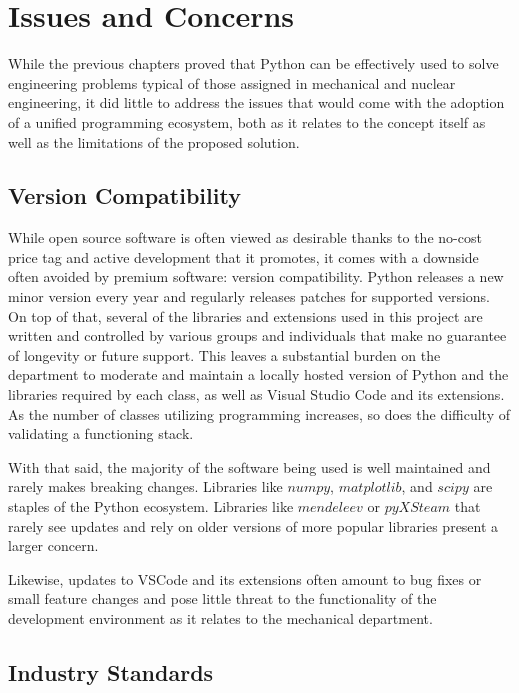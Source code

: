 \section{Issues and Concerns}

While the previous chapters proved that Python can be effectively
used to solve engineering problems typical of those assigned in 
mechanical and nuclear engineering, it did 
little to address the issues that would come with the adoption 
of a unified programming ecosystem, both as it relates to the
concept itself as well as the limitations of the proposed solution.

\subsection{Version Compatibility}

While open source software is often viewed as desirable
thanks to the no-cost price tag and active development that it 
promotes, it comes with a downside often avoided by premium
software: version compatibility. Python releases a new minor version
every year and regularly releases patches for supported versions.
On top of that, several of the libraries and extensions 
used in this project are written and controlled by various 
groups and individuals that make no guarantee of longevity or future
support. This leaves a substantial burden on the department to
moderate and maintain a locally hosted version of Python and the
libraries required by each class, as well as Visual Studio Code and
its extensions. As the number of classes utilizing programming
increases, so does the difficulty of validating a functioning stack.

With that said, the majority of the software being used is well
maintained and rarely makes breaking changes. Libraries like $numpy$,
$matplotlib$, and $scipy$ are staples of the Python ecosystem. Libraries
like $mendeleev$ or $pyXSteam$ that rarely see updates and rely on older
versions of more popular libraries present a larger concern.

Likewise, updates to VSCode and its extensions often
amount to bug fixes or small feature changes and pose little threat
to the functionality of the development environment as it relates to
the mechanical department.

\subsection{Industry Standards}

